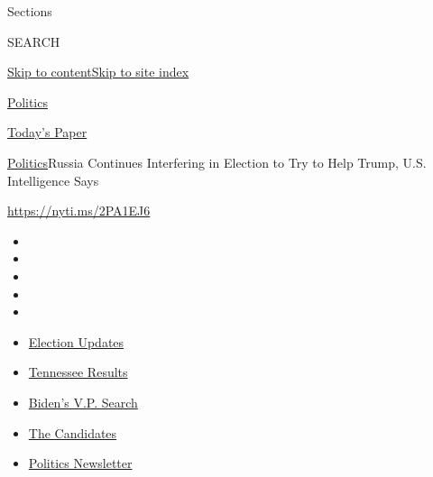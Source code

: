 Sections

SEARCH

\protect\hyperlink{site-content}{Skip to
content}\protect\hyperlink{site-index}{Skip to site index}

\href{https://www.nytimes3xbfgragh.onion/section/politics}{Politics}

\href{https://myaccount.nytimes3xbfgragh.onion/auth/login?response_type=cookie\&client_id=vi}{}

\href{https://www.nytimes3xbfgragh.onion/section/todayspaper}{Today's
Paper}

\href{/section/politics}{Politics}\textbar{}Russia Continues Interfering
in Election to Try to Help Trump, U.S. Intelligence Says

\url{https://nyti.ms/2PA1EJ6}

\begin{itemize}
\item
\item
\item
\item
\item
\end{itemize}

\begin{itemize}
\item
  \href{https://www.nytimes3xbfgragh.onion/2020/08/07/us/elections/biden-vs-trump.html?action=click\&pgtype=Article\&state=default\&region=TOP_BANNER\&context=storylines_menu}{Election
  Updates}
\item
  \href{https://www.nytimes3xbfgragh.onion/interactive/2020/08/06/us/elections/results-tennessee-primary-elections.html?action=click\&pgtype=Article\&state=default\&region=TOP_BANNER\&context=storylines_menu}{Tennessee
  Results}
\item
  \href{https://www.nytimes3xbfgragh.onion/article/biden-vice-president-2020.html?action=click\&pgtype=Article\&state=default\&region=TOP_BANNER\&context=storylines_menu}{Biden's
  V.P. Search}
\item
  \href{https://www.nytimes3xbfgragh.onion/interactive/2019/us/politics/2020-presidential-candidates.html?action=click\&pgtype=Article\&state=default\&region=TOP_BANNER\&context=storylines_menu}{The
  Candidates}
\item
  \href{https://www.nytimes3xbfgragh.onion/newsletters/politics?action=click\&pgtype=Article\&state=default\&region=TOP_BANNER\&context=storylines_menu}{Politics
  Newsletter}
\end{itemize}

